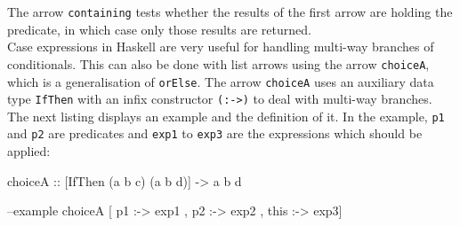 \documentclass[11pt,a4paper,headsepline, bibtotoc]{scrreprt}
\begin{document}
The arrow \texttt{containing} tests whether the results of the first arrow are holding the predicate, in which case only those results are returned.\\
Case expressions in Haskell are very useful for handling multi-way branches of conditionals. This can also be done with list arrows using the arrow \texttt{choiceA}, which is a generalisation of \texttt{orElse}. The arrow \texttt{choiceA} uses an auxiliary data type \texttt{IfThen} with an infix constructor \texttt{(:->)} to deal with multi-way branches. The next listing displays an example and the definition of it. In the example, \texttt{p1} and \texttt{p2} are predicates and \texttt{exp1} to \texttt{exp3} are the expressions which should be applied:
\begin{code}[caption=choiceA Example]
choiceA :: [IfThen (a b c) (a b d)] -> a b d

--example
choiceA [ p1   :-> exp1
        , p2   :-> exp2
        , this :-> exp3]
\end{code} 
\end{document}
